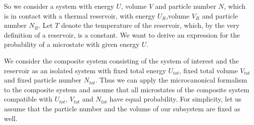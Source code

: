 \documentclass[a4paper, draft]{report}
\numberwithin{section}{chapter}
\numberwithin{equation}{chapter}
\theoremstyle{own}
\theoremstyle{remark}
\begin{document}
So we consider a system with energy $U$, volume $V$ and particle number $N$, which is in contact with a thermal reservoir, with energy $U_R$,volume $V_R$ and particle number $N_R$. Let $T$ denote the temperature of the reservoir, which, by the very definition of a reservoir, is a constant. We want to derive an expression for the probability of a microstate with given energy $U$.

We consider the composite system consisting of the system of interest and the reservoir as an isolated system with fixed total energy $U_{tot}$, fixed total volume $V_{tot}$ and fixed particle number $N_{tot}$. Thus we can apply the microcanonical formalism to the composite system and assume that all microstates of the composite system compatible with $U_{tot}$, $V_{tot}$ and $N_{tot}$ have equal probability. For simplicity, let us assume that the particle number and the volume of our subsystem are fixed as well. 
\end{document}
